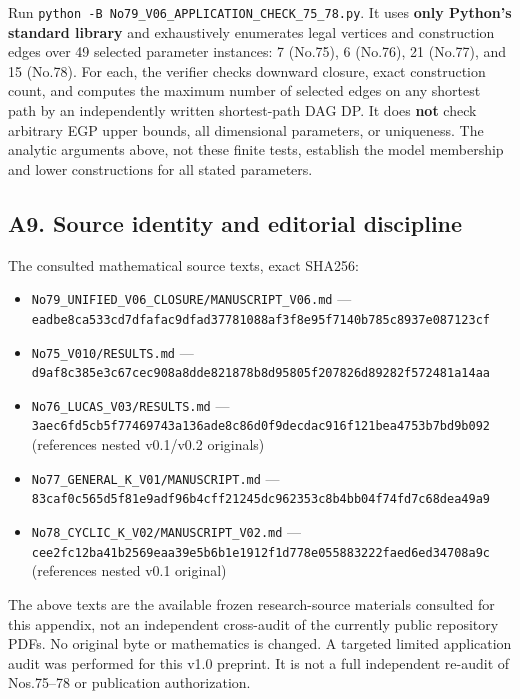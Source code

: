 \documentclass[
]{article}
\providecommand{\tightlist}{%
  \setlength{\itemsep}{0pt}\setlength{\parskip}{0pt}}
\begin{document}
Run \texttt{python\ -B\ No79\_V06\_APPLICATION\_CHECK\_75\_78.py}. It
uses \textbf{only Python's standard library} and exhaustively enumerates
legal vertices and construction edges over 49 selected parameter
instances: 7 (No.75), 6 (No.76), 21 (No.77), and 15 (No.78). For each,
the verifier checks downward closure, exact construction count, and
computes the maximum number of selected edges on any shortest path by an
independently written shortest-path DAG DP. It does \textbf{not} check
arbitrary EGP upper bounds, all dimensional parameters, or uniqueness.
The analytic arguments above, not these finite tests, establish the
model membership and lower constructions for all stated parameters.

\subsection{A9. Source identity and editorial
discipline}\label{a9.-source-identity-and-editorial-discipline}

The consulted mathematical source texts, exact SHA256:

\begin{itemize}
\tightlist
\item
  \texttt{No79\_UNIFIED\_V06\_CLOSURE/MANUSCRIPT\_V06.md} ---
  \nolinkurl{eadbe8ca533cd7dfafac9dfad37781088af3f8e95f7140b785c8937e087123cf}
\item
  \texttt{No75\_V010/RESULTS.md} ---
  \nolinkurl{d9af8c385e3c67cec908a8dde821878b8d95805f207826d89282f572481a14aa}
\item
  \texttt{No76\_LUCAS\_V03/RESULTS.md} ---
  \nolinkurl{3aec6fd5cb5f77469743a136ade8c86d0f9decdac916f121bea4753b7bd9b092}
  (references nested v0.1/v0.2 originals)
\item
  \texttt{No77\_GENERAL\_K\_V01/MANUSCRIPT.md} ---
  \nolinkurl{83caf0c565d5f81e9adf96b4cff21245dc962353c8b4bb04f74fd7c68dea49a9}
\item
  \texttt{No78\_CYCLIC\_K\_V02/MANUSCRIPT\_V02.md} ---
  \nolinkurl{cee2fc12ba41b2569eaa39e5b6b1e1912f1d778e055883222faed6ed34708a9c}
  (references nested v0.1 original)
\end{itemize}

The above texts are the available frozen research-source materials
consulted for this appendix, not an independent cross-audit of the
currently public repository PDFs. No original byte or mathematics is
changed. A targeted limited application audit was performed for this
v1.0 preprint. It is not a full independent re-audit of Nos.75--78
or publication authorization.
\end{document}
